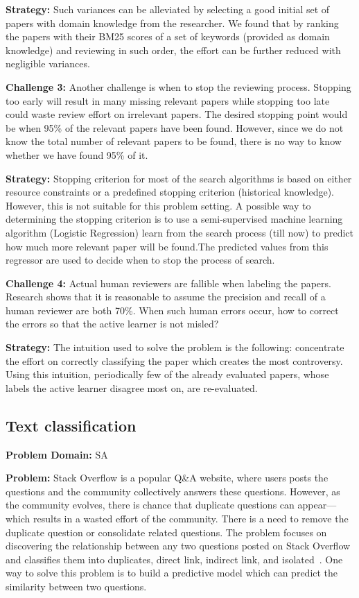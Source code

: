 \documentclass[table, xcdraw, sigconf,review, anonymous]{acmart}
\begin{document}
\noindent\textbf{Strategy: }
Such variances can be alleviated by selecting a good initial set of papers with domain knowledge from the researcher. We found that by ranking the papers with their BM25 scores of a set of keywords (provided as domain knowledge) and reviewing in such order, the effort can be further reduced with negligible variances.
   
\vspace{1.0ex}
\noindent\textbf{Challenge 3: }
Another challenge is when to stop the reviewing process. Stopping too early will result in many missing relevant papers while stopping too late could waste review effort on irrelevant papers. The desired stopping point would be when 95\% of the relevant papers have been found. However, since we do not know the total number of relevant papers to be found, there is no way to know whether we have found 95\% of it.

\noindent\textbf{Strategy: }
Stopping criterion for most of the search algorithms is based on either resource constraints or a predefined stopping criterion (historical knowledge). However, this is not suitable for this problem setting. A possible way to determining the stopping criterion is to use a semi-supervised machine learning algorithm (Logistic Regression) learn from the search process (till now) to predict how much more relevant paper will be found.The predicted values from this regressor are used to decide when to stop the process of search.
   
\vspace{1.0ex}
\noindent\textbf{Challenge 4: }
Actual human reviewers are fallible when labeling the papers. Research shows that it is reasonable to assume the precision and recall of a human reviewer are both 70\%. When such human errors occur, how to correct the errors so that the active learner is not misled?

\noindent\textbf{Strategy: }
The intuition used to solve the problem is the following: concentrate the effort on correctly classifying the paper which creates the most controversy. Using this intuition, periodically few of the already evaluated papers, whose labels the active learner disagree most on, are re-evaluated.

\subsection{Text classification}
\noindent\textbf{Problem Domain: } SA

\noindent\textbf{Problem: } Stack Overflow is a popular Q\&A website, where users posts the questions and the community collectively answers these questions. However, as the community evolves, there is chance that duplicate questions can appear---which results in a wasted effort of the community. There is a need to remove the duplicate question or consolidate related questions. The problem focuses on discovering the relationship between any two questions posted on Stack Overflow and classifies them into duplicates, direct link, indirect link, and isolated~\cite{fu2017easy, xu2016predicting}. One way to solve this problem is to build a predictive model which can predict the similarity between two questions. 
\end{document}
